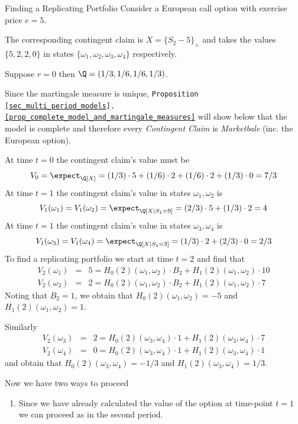 \documentclass[11pt,a4paper]{article}
\begin{document}
  \begin{example}{Finding a Replicating Portfolio}
    Consider a European call option with exercise price $e=5$.
    \par The corresponding contingent claim is $X=\{S_2-5\}_+$ and takes the values $\{5,2,2,0\}$ in states $\{\omega_1,\omega_2,\omega_3,\omega_4\}$ respectively.
    \par Suppose $r=0$ then $\Q=(1/3,1/6,1/6,1/3)$.
    \par Since the martingale measure is unique, \texttt{Proposition \ref{sec_multi_period_models}.\ref{prop_complete_model_and_martingale_measures}} will show below that the model is complete and therefore every \textit{Contingent Claim} is \textit{Marketbale} (inc. the European option).
    \par At time $t=0$ the contingent claim's value must be
    \[ V_0=\expect_\Q[X]=(1/3)\cdot5+(1/6)\cdot2+(1/6)\cdot2+(1/3)\cdot0=7/3 \]
    At time $t=1$ the contingent claim's value in states $\omega_1,\omega_2$ is
    \[ V_1(\omega_1)=V_1(\omega_2)=\expect_\Q[X|S_1=9]=(2/3)\cdot5+(1/3)\cdot2=4 \]
    At time $t=1$ the contingent claim's value in states $\omega_3,\omega_4$ is
    \[ V_1(\omega_3)=V_1(\omega_4)=\expect_\Q[X|S_1=3]=(1/3)\cdot2+(2/3)\cdot0=2/3 \]
    To find a replicating portfolio we start at time $t=2$ and find that
    \[\begin{array}{rcl}
      V_2(\omega_1)&=&5=H_0(2)(\omega_1,\omega_2)\cdot B_2+H_1(2)(\omega_1,\omega_2)\cdot 10\\
      V_2(\omega_2)&=&2=H_0(2)(\omega_1,\omega_2)\cdot B_2+H_1(2)(\omega_1,\omega_2)\cdot 7
    \end{array}\]
    Noting that $B_2=1$, we obtain that $H_0(2)(\omega_1,\omega_2)=-5$ and $H_1(2)(\omega_1,\omega_2)=1$.
    \par Similarly
    \[\begin{array}{rcl}
      V_2(\omega_3)&=&2=H_0(2)(\omega_3,\omega_4)\cdot 1+H_1(2)(\omega_3,\omega_4)\cdot 7\\
      V_2(\omega_4)&=&0=H_0(2)(\omega_3,\omega_4)\cdot 1+H_1(2)(\omega_3,\omega_4)\cdot 1
    \end{array}\]
    and obtain that $H_0(2)(\omega_3,\omega_4)=-1/3$ and $H_1(2)(\omega_3,\omega_4)=1/3$.
    \par Now we have two ways to proceed
    \begin{enumerate}
      \item Since we have already calculated the value of the option at time-point $t=1$ we can proceed as in the second period.

\end{enumerate}
\end{example}
\end{document}

